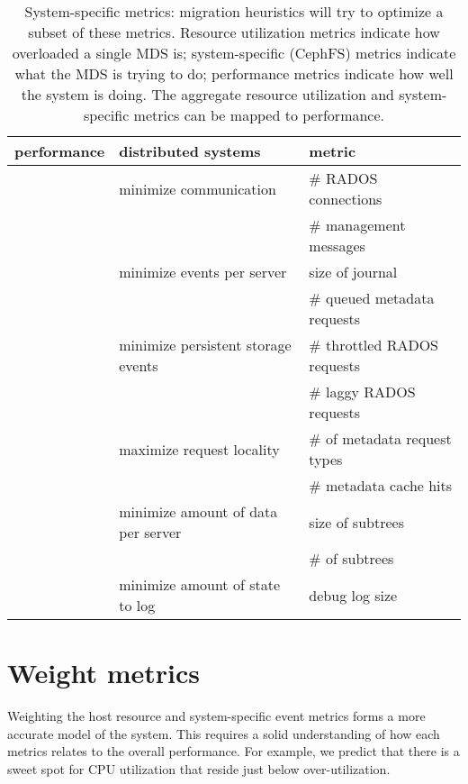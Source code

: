 \begin{table}
	\centering
	\caption{System-specific metrics: migration heuristics will try to optimize a subset of these metrics. Resource utilization metrics indicate how overloaded a single MDS is; system-specific (CephFS) metrics indicate what the MDS is trying to do; performance metrics indicate how well the system is doing. The aggregate resource utilization and system-specific metrics can be mapped to performance. \label{table-system-specific}}
	\begin{ssp}	
    	\begin{tabular}{ 
					>{\centering}m{0.5cm} 	|| 
					>{}m{6cm}				|
					>{}m{5cm}				
					}
					performance
					& \centering distributed systems
					& \centering metric
					 \tabularnewline \hline\hline					
	\multicolumn{1}{r||}{responsiveness \(\uparrow\)}
					& minimize communication 
					& \# RADOS connections
					\tabularnewline
	\multicolumn{1}{r||}{}
					&
					& \# management messages 
					\tabularnewline					
	\multicolumn{1}{r||}{}
					& minimize events per server
					& size of journal
					\tabularnewline		
	\multicolumn{1}{r||}{}
					& 
					& \# queued metadata requests
					\tabularnewline
	\multicolumn{1}{r||}{}
					& minimize persistent storage events
					& \# throttled RADOS requests
					\tabularnewline
	\multicolumn{1}{r||}{}
					& 
					& \# laggy RADOS requests
					\tabularnewline
	\multicolumn{1}{r||}{throughput \(\uparrow\)}
					& maximize request locality 
					& \# of metadata request types
					\tabularnewline																		
	\multicolumn{1}{r||}{}
					& 
					& \# metadata cache hits
					\tabularnewline						
	\multicolumn{1}{r||}{}
					& minimize amount of data per server
					& size of subtrees
					\tabularnewline																		
	\multicolumn{1}{r||}{}
					& 
					& \# of subtrees
					\tabularnewline																			
	\multicolumn{1}{r||}{}
					& minimize amount of state to log
					& debug log size
					\tabularnewline						
    \end{tabular}
	\end{ssp}	    
\end{table}


\section{Weight metrics}
Weighting the host resource and system-specific event metrics forms a more accurate model of the system. This requires a solid understanding of how each metrics relates to the overall performance. For example, we predict that there is a sweet spot for CPU utilization that reside just below over-utilization. 

